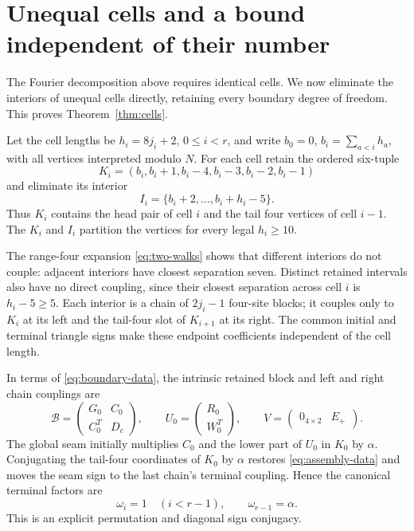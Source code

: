 \section{Unequal cells and a bound independent of their number}
\label{sec:cells}

The Fourier decomposition above requires identical cells. We now eliminate
the interiors of unequal cells directly, retaining every boundary degree
of freedom. This proves Theorem~\ref{thm:cells}.

Let the cell lengths be $h_i=8j_i+2$, $0\le i<r$, and write
$b_0=0$, $b_i=\sum_{a<i}h_a$, with all vertices interpreted modulo $N$.
For each cell retain the ordered six-tuple
\begin{equation}
 K_i=(b_i,b_i+1,b_i-4,b_i-3,b_i-2,b_i-1)
 \label{eq:retained}
\end{equation}
and eliminate its interior
\[
 I_i=\{b_i+2,\ldots,b_i+h_i-5\}.
\]
Thus $K_i$ contains the head pair of cell $i$ and the tail four vertices
of cell $i-1$. The $K_i$ and $I_i$ partition the vertices for every
legal $h_i\ge10$.

The range-four expansion \eqref{eq:two-walks} shows that different
interiors do not couple: adjacent interiors have closest separation seven.
Distinct retained intervals also have no direct coupling, since their
closest separation across cell $i$ is $h_i-5\ge5$.
Each interior is a chain of $2j_i-1$ four-site blocks; it couples only
to $K_i$ at its left and the tail-four slot of $K_{i+1}$ at its right.
The common initial and terminal triangle signs make these endpoint
coefficients independent of the cell length.

In terms of \eqref{eq:boundary-data}, the intrinsic retained block and
left and right chain couplings are
\begin{equation}
 \mathcal B=\begin{pmatrix}G_0&C_0\\C_0^T&D_c\end{pmatrix},
 \qquad U_0=\begin{pmatrix}R_0\\W_0^T\end{pmatrix},
 \qquad V=\begin{pmatrix}0_{4\times2}&E_+\end{pmatrix}.
 \label{eq:assembly-data}
\end{equation}
The global seam initially multiplies $C_0$ and the lower part of $U_0$
in $K_0$ by $\alpha$. Conjugating the tail-four coordinates of $K_0$ by
$\alpha$ restores \eqref{eq:assembly-data} and moves the seam sign to the
last chain's terminal coupling. Hence the canonical terminal factors are
\[
 \omega_i=1\quad(i<r-1),\qquad\omega_{r-1}=\alpha.
\]
This is an explicit permutation and diagonal sign conjugacy.

